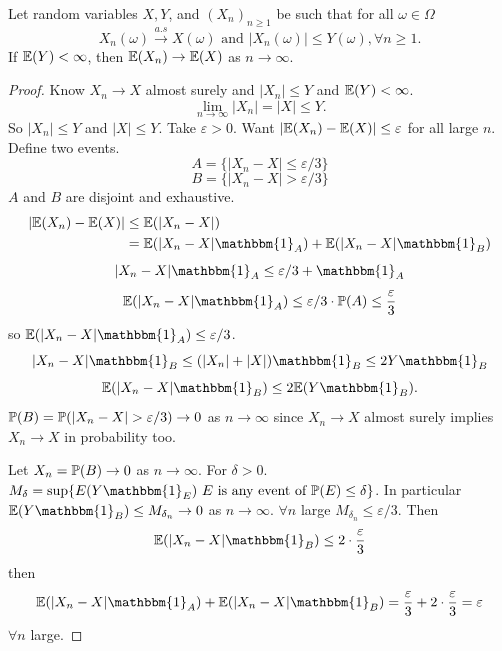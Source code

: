 \documentclass[10pt, a4paper]{article}
\begin{document}
\begin{theorem}
    Let random variables $X, Y$,
    and $(X_n)_{n \geq 1}$ be such that for all $\omega \in \Omega$
    \[
    X_n(\omega) \overset{a.s}{\to} X(\omega)\text{ and } |X_n(\omega)| \leq Y(\omega), \forall n \geq 1.
    \]
    If $\E(Y) < \infty$,
    then $\E(X_n) \to \E(X)$ as $n \to \infty$.

    \begin{proof}
        Know $X_n \to X$ almost surely and $|X_n| \leq Y$ and $\E(Y) < \infty$.
        \[
        \lim_{n \to \infty}|X_n| = |X| \leq Y.
        \]
        So $|X_n| \leq Y$ and $|X| \leq Y$.
        Take $\varepsilon > 0$.
        Want $|\E(X_n) - \E(X)| \leq \varepsilon$ for all large $n$.
        Define two events.
        \[
        A = \{|X_n - X| \leq \varepsilon / 3\}
        \]
        \[
        B = \{|X_n - X| > \varepsilon / 3\}
        \]
        $A$ and $B$ are disjoint and exhaustive.
        \begin{align*}
            |\E(X_n) - \E(X)| &\leq \E(|X_n - X|) \\
            &= \E(|X_n - X|\mathbbm{1}_{A}) + \E(|X_n - X|\mathbbm{1}_{B})
        \end{align*}
        \[
        |X_n - X|\mathbbm{1}_{A} \leq \varepsilon / 3 + \mathbbm{1}_A
        \]
        \[
        \E(|X_n - X|\mathbbm{1}_{A}) \leq \varepsilon / 3 \cdot \P(A) \leq \frac{\varepsilon}{3}
        \]
        so $\E(|X_n - X|\mathbbm{1}_{A}) \leq \varepsilon / 3$.
        \[
        |X_n - X|\mathbbm{1}_{B} \leq (|X_n| + |X|)\mathbbm{1}_{B} \leq 2Y\mathbbm{1}_{B}
        \]
        \[
        \E(|X_n - X|\mathbbm{1}_{B}) \leq 2\E(Y\mathbbm{1}_{B}).
        \]
        $\P(B) = \P(|X_n - X| > \varepsilon / 3) \to 0$ as $n \to \infty$ since $X_n \to X$ almost surely implies $X_n \to X$ in probability too.

        Let $X_n = \P(B) \to 0$ as $n \to \infty$.
        For $\delta > 0$.
        $M_{\delta} = \sup\{E(Y\mathbbm{1}_{E})\text{ $E$ is any event of $\P(E) \leq \delta$}\}$.
        In particular $\E(Y\mathbbm{1}_{B}) \leq M_{\delta_n} \to 0$ as $n \to \infty$.
        $\forall n$ large $M_{\delta_n} \leq \varepsilon / 3$.
        Then
        \[
        \E(|X_n - X|\mathbbm{1}_{B}) \leq 2\cdot\frac{\varepsilon}{3}
        \]
        then
        \[
        \E(|X_n - X|\mathbbm{1}_{A}) + \E(|X_n - X|\mathbbm{1}_{B}) = \frac{\varepsilon}{3} + 2\cdot\frac{\varepsilon}{3} = \varepsilon
        \]
        $\forall n$ large.
    \end{proof}
\end{theorem}
\end{document}
